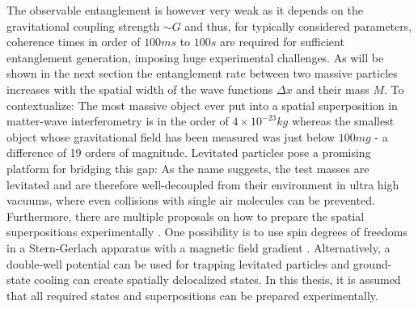 The observable entanglement is however very weak as it depends on the gravitational coupling strength $\sim G$ and thus, for typically considered parameters, coherence times in order of $100\si{ms}$ to $100\si{s}$ are required for sufficient entanglement generation, imposing huge experimental challenges.
As will be shown in the next section the entanglement rate between two massive particles increases with the spatial width of the wave functions $\Delta x$ and their mass $M$.
To contextualize: The most massive object ever put into a spatial superposition in matter-wave interferometry is in the order of $4\times 10^{-23}\si{kg}$ \cite{Fein_2019} whereas the smallest object whose gravitational field has been measured was just below $100\si{mg}$ \cite{Westphal_2021} - a difference of 19 orders of magnitude.
Levitated particles pose a promising platform for bridging this gap: As the name suggests, the test masses are levitated and are therefore well-decoupled from their environment in ultra high vacuums, where even collisions with single air molecules can be prevented.
Furthermore, there are multiple proposals on how to prepare the spatial superpositions experimentally \cite{Bose_2017,Krisnanda_2020,Marletto_2017}.
One possibility is to use spin degrees of freedoms in a Stern-Gerlach apparatus with a magnetic field gradient \cite{Bose_2017}.
Alternatively, a double-well potential can be used for trapping levitated particles and ground-state cooling can create spatially delocalized states.
In this thesis, it is assumed that all required states and superpositions can be prepared experimentally.

